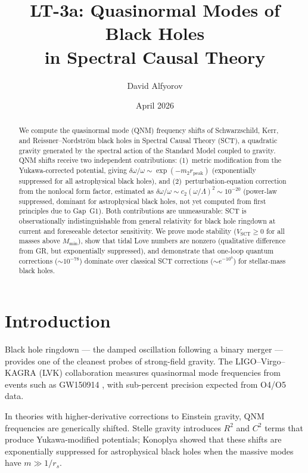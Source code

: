\documentclass[11pt,a4paper]{article}
\title{LT-3a: Quasinormal Modes of Black Holes\\in Spectral Causal Theory}
\author{David Alfyorov}
\date{April 2026}
\newcommand{\Mmin}{M_{\mathrm{min}}}
\begin{document}
\maketitle

\begin{abstract}
We compute the quasinormal mode (QNM) frequency shifts of Schwarzschild,
Kerr, and Reissner--Nordstr\"om black holes in Spectral Causal Theory (SCT),
a quadratic gravity generated by the spectral action of the Standard Model
coupled to gravity. QNM shifts receive two independent contributions:
(1)~metric modification from the Yukawa-corrected potential,
giving $\delta\omega/\omega \sim \exp(-m_2 r_{\mathrm{peak}})$
(exponentially suppressed for all astrophysical black holes), and
(2)~perturbation-equation correction from the nonlocal form factor,
estimated as $\delta\omega/\omega \sim c_2(\omega/\Lambda)^2 \sim 10^{-20}$
(power-law suppressed, dominant for astrophysical black holes, not yet
computed from first principles due to Gap~G1).
Both contributions are unmeasurable: SCT is observationally indistinguishable
from general relativity for black hole ringdown at current and foreseeable
detector sensitivity. We prove mode stability ($V_{\mathrm{SCT}} \geq 0$
for all masses above $\Mmin$), show that tidal Love numbers are nonzero
(qualitative difference from GR, but exponentially suppressed), and
demonstrate that one-loop quantum corrections ($\sim 10^{-78}$) dominate
over classical SCT corrections ($\sim e^{-10^9}$) for stellar-mass black holes.
\end{abstract}

\tableofcontents

\section{Introduction}

Black hole ringdown --- the damped oscillation following a binary merger ---
provides one of the cleanest probes of strong-field gravity.
The LIGO--Virgo--KAGRA (LVK) collaboration measures quasinormal mode
frequencies from events such as GW150914 \cite{Berti:2009}, with sub-percent
precision expected from O4/O5 data.

In theories with higher-derivative corrections to Einstein gravity,
QNM frequencies are generically shifted. Stelle gravity
\cite{Stelle:1977} introduces $R^2$ and $C^2$ terms that produce
Yukawa-modified potentials; Konoplya \cite{Konoplya:2003} showed that
these shifts are exponentially suppressed for astrophysical black holes
when the massive modes have $m \gg 1/r_s$.
\end{document}
